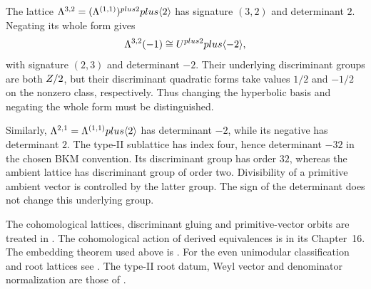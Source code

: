 \begin{remark}
\label{rem:discriminant-conventions}
The lattice $\Lambda^{3,2}=(\Lambda^{(1,1)})^{plus2}plus\langle2\rangle$
has signature $(3,2)$ and determinant $2$.  Negating its whole form
gives
\[
\Lambda^{3,2}(-1)\cong U^{plus2}plus\langle-2\rangle,
\]
with signature $(2,3)$ and determinant $-2$.  Their underlying
discriminant groups are both $Z/2$, but their discriminant
quadratic forms take values $1/2$ and $-1/2$ on the nonzero class,
respectively.  Thus changing the hyperbolic basis and negating the
whole form must be distinguished.

Similarly, $\Lambda^{2,1}=\Lambda^{(1,1)}plus\langle2\rangle$ has
determinant $-2$, while its negative has determinant $2$.
The type-II sublattice has index four, hence determinant $-32$
in the chosen BKM convention.  Its discriminant group has order
$32$, whereas the ambient lattice has discriminant group of order
two.  Divisibility of a primitive ambient vector is controlled by
the latter group.  The sign of the determinant does not change this
underlying group.
\end{remark}

\begin{remark}
\label{rem:lattice-primary-lit}
The cohomological lattices, discriminant gluing and primitive-vector
orbits are treated in \cite[Chapter~14]{HuybrechtsK3}.  The
cohomological action of derived equivalences is in its Chapter~16.
The embedding theorem used above is
\cite[Theorem~1.14.4]{Nikulin1980}.  For the even unimodular
classification and root lattices see \cite{ConwaySloane}.
The type-II root datum, Weyl vector and denominator normalization
are those of \cite[Theorem~2.1]{GNII}.
\end{remark}
